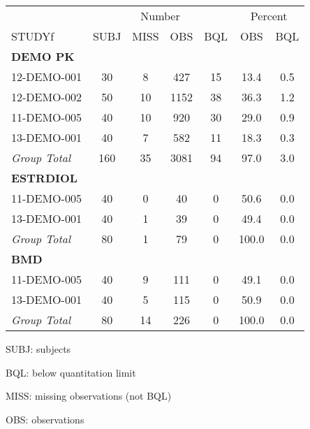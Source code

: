 \setlength{\tabcolsep}{5pt} 
\begin{threeparttable}
\renewcommand{\arraystretch}{1.3}
\begin{tabular}[h]{lcccccc}
\hline
\multicolumn{1}{c}{} & \multicolumn{4}{c}{Number} & \multicolumn{2}{c}{Percent} \\
\cmidrule(lr){2-5}
\cmidrule(lr){6-7}
STUDYf & SUBJ & MISS & OBS & BQL & OBS & BQL \\
\hline
\multicolumn{7}{l}{\textbf{DEMO PK}}\\
12-DEMO-001 & 30 & 8 & 427 & 15 & 13.4 & 0.5 \\
12-DEMO-002 & 50 & 10 & 1152 & 38 & 36.3 & 1.2 \\
11-DEMO-005 & 40 & 10 & 920 & 30 & 29.0 & 0.9 \\
13-DEMO-001 & 40 & 7 & 582 & 11 & 18.3 & 0.3 \\
\hline {\it Group Total} & 160 & 35 & 3081 & 94 & 97.0 & 3.0 \\
\hline \multicolumn{7}{l}{\textbf{ESTRDIOL}}\\
11-DEMO-005 & 40 & 0 & 40 & 0 & 50.6 & 0.0 \\
13-DEMO-001 & 40 & 1 & 39 & 0 & 49.4 & 0.0 \\
\hline {\it Group Total} & 80 & 1 & 79 & 0 & 100.0 & 0.0 \\
\hline \multicolumn{7}{l}{\textbf{BMD}}\\
11-DEMO-005 & 40 & 9 & 111 & 0 & 49.1 & 0.0 \\
13-DEMO-001 & 40 & 5 & 115 & 0 & 50.9 & 0.0 \\
\hline {\it Group Total} & 80 & 14 & 226 & 0 & 100.0 & 0.0 \\
\hline
\end{tabular}
\begin{tablenotes}[flushleft]
\item SUBJ: subjects
\item BQL: below quantitation limit
\item MISS: missing observations (not BQL)
\item OBS: observations
\end{tablenotes}
\end{threeparttable}
